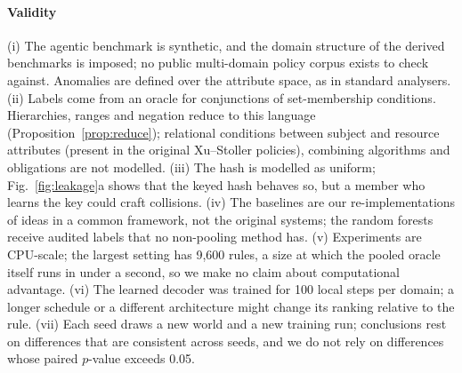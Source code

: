 \documentclass[preprint,12pt]{elsarticle}
\theoremstyle{definition}
\begin{document}
\paragraph{Validity} (i) The agentic benchmark is synthetic, and the domain structure of the derived benchmarks is imposed; no public multi-domain policy corpus exists to check against. Anomalies are defined over the attribute space, as in standard analysers. (ii) Labels come from an oracle for conjunctions of set-membership conditions. Hierarchies, ranges and negation reduce to this language (Proposition~\ref{prop:reduce}); relational conditions between subject and resource attributes (present in the original Xu--Stoller policies), combining algorithms and obligations are not modelled. (iii) The hash is modelled as uniform; Fig.~\ref{fig:leakage}a shows that the keyed hash behaves so, but a member who learns the key could craft collisions. (iv) The baselines are our re-implementations of ideas in a common framework, not the original systems; the random forests receive audited labels that no non-pooling method has. (v) Experiments are CPU-scale; the largest setting has 9{,}600 rules, a size at which the pooled oracle itself runs in under a second, so we make no claim about computational advantage. (vi) The learned decoder was trained for 100 local steps per domain; a longer schedule or a different architecture might change its ranking relative to the rule. (vii) Each seed draws a new world and a new training run; conclusions rest on differences that are consistent across seeds, and we do not rely on differences whose paired $p$-value exceeds 0.05.

\end{document}
